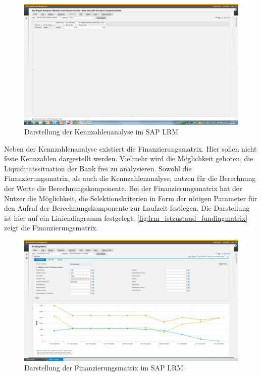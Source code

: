 \begin{onehalfspacing}
\begin{figure}[!ht]
\centering
\setlength{\unitlength}{1mm}
\includegraphics[width=15cm]{images/KeyFigureAnalysis_Example.png}
\caption{Darstellung der Kennzahlenanalyse im SAP LRM\label{fig:lrm_istzustand_keyfigureanalysis}}
\end{figure} 

Neben der Kennzahlenanalyse existiert die Finanzierungsmatrix. Hier sollen nicht feste Kennzahlen dargestellt werden. Vielmehr wird  die Möglichkeit geboten, die Liquiditätssituation der Bank frei zu analysieren. Sowohl die Finanzierungsmatrix, als auch die Kennzahlenanalyse, nutzen für die Berechnung der Werte die Berechnungskomponente. Bei der Finanzierungsmatrix hat der Nutzer die Möglichkeit, die Selektionskriterien in Form der nötigen Parameter für den Aufruf der Berechnungskomponente zur Laufzeit festlegen. Die Darstellung ist hier auf ein Liniendiagramm festgelegt. \vref{fig:lrm_istzustand_fundingmatrix} zeigt die Finanzierungsmatrix.

\begin{figure}[!ht]
\centering
\setlength{\unitlength}{1mm}
\includegraphics[width=15cm]{images/Funding_Matrix_Example.png}
\caption{Darstellung der Finanzierungsmatrix im SAP LRM\label{fig:lrm_istzustand_fundingmatrix}}
\end{figure} 


\end{onehalfspacing}
